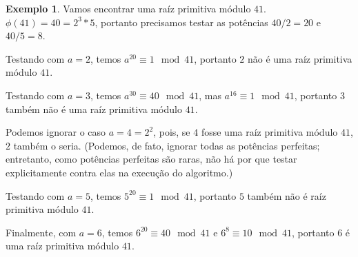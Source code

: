 \documentclass{article}
\theoremstyle{definition}
\newtheorem{example}{Exemplo}
\begin{document}
\begin{example}
    Vamos encontrar uma raíz primitiva módulo $41$.
    $\phi(41) = 40 = 2^3*5$,
    portanto precisamos testar as potências $40/2 = 20$ e $40/5 = 8$.

    Testando com $a = 2$, temos $a^{20} \equiv 1 \mod 41$,
    portanto $2$ não é uma raíz primitiva módulo $41$.

    Testando com $a = 3$, temos $a^{30} \equiv 40 \mod 41$,
    mas $a^{16} \equiv 1 \mod 41$,
    portanto $3$ também não é uma raíz primitiva módulo $41$.

    Podemos ignorar o caso $a = 4 = 2^2$,
    pois, se $4$ fosse uma raíz primitiva módulo $41$,
    $2$ também o seria.
    (Podemos, de fato, ignorar todas as potências perfeitas;
    entretanto,
    como potências perfeitas são raras,
    não há por que testar explicitamente contra elas na execução do algoritmo.)

    Testando com $a = 5$, temos $5^{20} \equiv 1 \mod 41$,
    portanto $5$ também não é raíz primitiva módulo $41$.

    Finalmente, com $a = 6$, temos $6^{20} \equiv 40 \mod 41$
    e $6^8 \equiv 10 \mod 41$,
    portanto $6$ é uma raíz primitiva módulo $41$.
\end{example}



\end{document}
